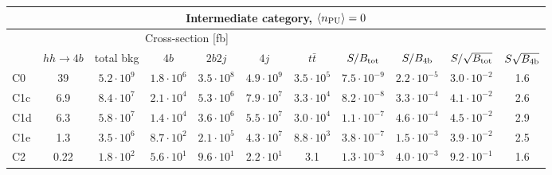 \begin{tabular}{|l|cc|cccc|cccc|}
  \hline
\multicolumn{11}{|c|}{Intermediate category, $\left\langle n_{\rm PU}\right\rangle=0$}\\
\hline
&  \multicolumn{6}{c|}{Cross-section [fb]} &  &  & &  \\
   &  $hh\to 4b$ &  total bkg  &   $4b$    &  $2b2j$   &   $4j$    &
$t\bar{t}$ &
$S/B_{\rm tot}$ & $S/B_{\rm 4b}$ & $S/\sqrt{B_{\rm tot}}$ & $S\sqrt{B_{\rm 4b}}$ \\
  \hline
  \hline
 C0      & 39  &   $5.2\cdot 10^9$   & $1.8\cdot 10^6$ & $3.5\cdot 10^8$ & $4.9\cdot 10^9$ & $3.5\cdot 10^5$ &  $7.5\cdot 10^{-9}$   & $2.2\cdot 10^{-5}$   &   $3.0\cdot 10^{-2}$   & 1.6  \\
 C1c     & 6.9  &   $8.4\cdot 10^7$   & $2.1\cdot 10^4$ & $5.3\cdot 10^6$ & $7.9\cdot 10^7$ & $3.3\cdot 10^4$ &  $8.2\cdot 10^{-8}$   & $3.3\cdot 10^{-4}$ &   $4.1\cdot 10^{-2}$   & 2.6 \\
 C1d     & 6.3  &   $5.8\cdot 10^7$   & $1.4\cdot 10^4$ & $3.6\cdot 10^6$ & $5.5\cdot 10^7$ & $3.0\cdot 10^4$ &  $1.1\cdot 10^{-7}$   & $4.6\cdot 10^{-4}$ &   $4.5\cdot 10^{-2}$   & 2.9\\
 C1e     & 1.3  &   $3.5\cdot 10^6$   & $8.7\cdot 10^2$ & $2.1\cdot 10^5$ & $4.3\cdot 10^7$ & $8.8\cdot 10^3$ &  $3.8\cdot 10^{-7}$   & $1.5\cdot 10^{-3}$  &   $3.9\cdot 10^{-2}$   & 2.5\\
 C2      & 0.22  &   $1.8\cdot 10^2$   & $5.6\cdot 10^1$ & $9.6\cdot 10^1$ & $2.2\cdot 10^1$ & 3.1 & $1.3\cdot 10^{-3}$   & $4.0\cdot 10^{-3}$  &   $9.2\cdot 10^{-1}$   & 1.6 \\
\hline
\end{tabular}
